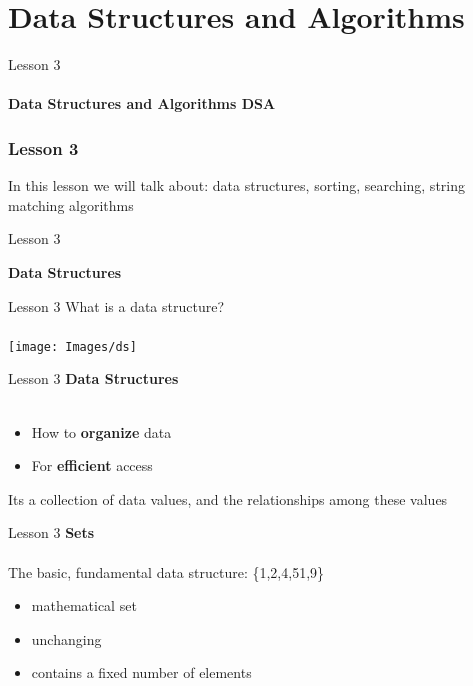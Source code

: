 \documentclass[aspectratio=1610]{beamer}
\begin{document}
\section{Data Structures and Algorithms}

\begin{frame}
\begin{center}
\Huge Lesson 3\\~\\
\textbf{Data Structures and Algorithms DSA}
\end{center}
\end{frame}



\begin{frame}
\frametitle{Lesson 3}

\Huge In this lesson we will talk about:
 \alert{data structures, sorting, searching, string matching algorithms}
\end{frame}



\begin{frame}{Lesson 3}{}
\begin{center}
\Huge \textbf{Data Structures}
\end{center}
\end{frame}


\begin{frame}{Lesson 3}{}
\Huge{What is a data structure?}\\~\\
\texttt{[image: Images/ds]}
\end{frame}



\begin{frame}{Lesson 3}{}
\LARGE
\textbf{Data Structures}\\~\\
\begin{itemize}
    \item How to \textbf{organize} data
    \item For \textbf{efficient} access
\end{itemize}

Its a collection of data values, and the relationships among these values
\end{frame}


\begin{frame}{Lesson 3}{}
\LARGE
\textbf{Sets}\\~\\
The basic, fundamental data structure: \{1,2,4,51,9\}
\begin{itemize}
    \item mathematical set
    \item unchanging
    \item contains a fixed number of elements
\end{itemize}

\end{frame}
\end{document}
